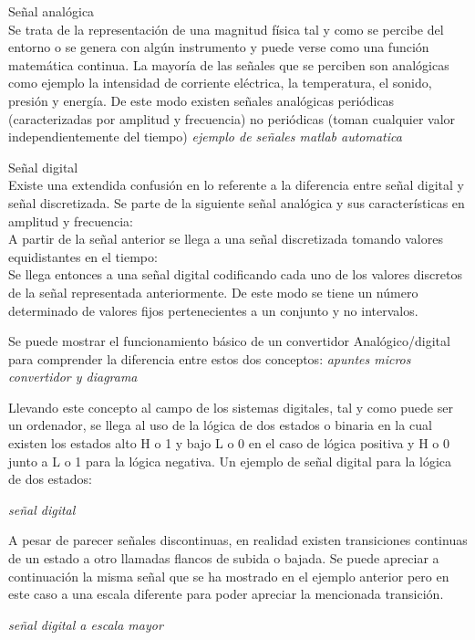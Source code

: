 \begin{list}{•}
\item Señal analógica
\\
Se trata de la representación de una magnitud física tal y como se percibe del entorno o se genera con algún instrumento y puede verse como una función matemática continua.
La mayoría de las señales que se perciben son analógicas como ejemplo la intensidad de corriente eléctrica, la temperatura, el sonido, presión y energía.
De este modo existen señales analógicas periódicas (caracterizadas por amplitud y frecuencia) no periódicas (toman cualquier valor independientemente del tiempo)
\textit {ejemplo de señales matlab automatica}

\item Señal digital
\\
Existe una extendida confusión en lo referente a la diferencia entre señal digital y señal discretizada. Se parte de la siguiente señal analógica y sus características en amplitud y frecuencia:
\\
A partir de la señal anterior se llega a una señal discretizada tomando valores equidistantes en el tiempo:
\\
Se llega entonces a una señal digital codificando cada uno de los valores discretos de la señal representada anteriormente. De este modo se tiene un número determinado de valores fijos pertenecientes a un conjunto y no intervalos.

Se puede mostrar el funcionamiento básico de un convertidor Analógico/digital para comprender la diferencia entre estos dos conceptos:
\textit{apuntes micros convertidor y diagrama}

Llevando este concepto al campo de los sistemas digitales, tal y como puede ser un ordenador, se llega al uso de la lógica de dos estados o binaria en la cual existen los estados alto H o 1 y bajo L o 0 en el caso de lógica positiva y H o 0 junto a L o 1 para la lógica negativa.
Un ejemplo de señal digital para la lógica de dos estados:

\textit{señal digital}

A pesar de parecer señales discontinuas, en realidad existen transiciones continuas de un estado a otro llamadas flancos de subida o bajada. 
Se puede apreciar a continuación la misma señal que se ha mostrado en el ejemplo anterior pero en este caso a una escala diferente para poder apreciar la mencionada transición.

\textit{señal digital a escala mayor}
\end{list}

